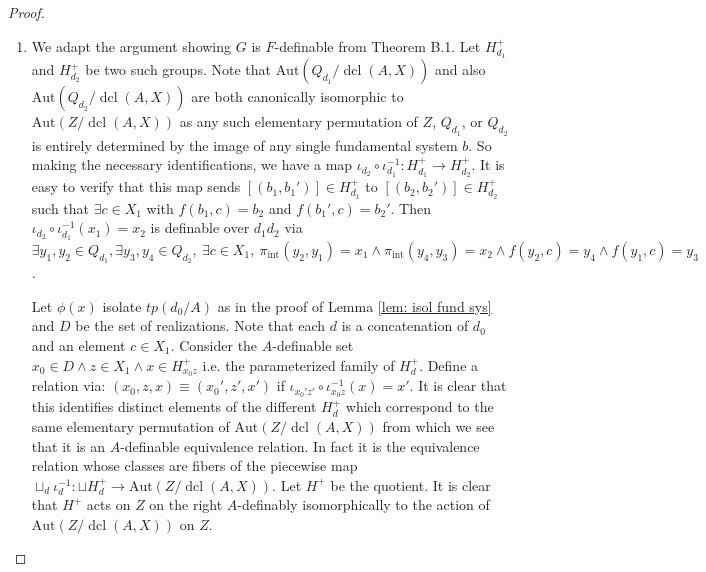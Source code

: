 \documentclass{amsart}
\theoremstyle{definition}
\theoremstyle{remark}
\numberwithin{equation}{section}
\def \tp {tp}
\def \aut {\text{Aut}}
\def \dcl {\operatorname{dcl}}
\begin{document}
\begin{proof}
\begin{enumerate}
        Let $\pi_{int}:Q^2_d \to H_d^+$ be the definable quotient map given by EI. The bijection $\iota_{d}:\aut(Q_{d}/\dcl(A,X)) \to H^+_{d}$ induces a group structure on $H^+_d$. It is an exercise to check that the group structure is defined by the following formula in the variables $x_1,x_2,x_3$ ranging over $H_d^+$:

        $\exists y_1,y_2,y_3 \in Q_d \ \pi_{int}(y_2,y_1) = x_2 \wedge \pi_{int}(y_3,y_2) = x_1 \wedge \pi_{int}(y_3,y_1) = x_3.$
        
        The action of $H^+_{d}$ on $Q_{d}$ is $A$-definable and agrees with the action of $\aut(Q_{\bar{d}}/\dcl(A,X))$: Let $[(b',b)] \in H^{+}_{\bar{d}}$ and $b'' \in Q_{d}$. Then we evaluate $[(b',b)]b''$ as the unique $b'''$ such that $\pi(b''',b'') = [(b',b)]$. This is $A$-definable. Let $x$ and $y,y_1$ be variables ranging over $H^{+}_{\bar{d}}$ and $Q_{d}$ respectively, then the action $xy = y_1$ is $A$-definable by the formula $\pi_{int}(y_1,y)=x$.   It is clear that this agrees with the action of $\aut(Q_{\bar{d}}/\dcl(A,X))$ on the left.
        
        \item We adapt the argument showing $G$ is $F$-definable from \cite{EhudHrushovski2002} Theorem B.1. Let $H^+_{d_1}$ and $H^+_{d_2}$ be two such groups. Note that $\aut(Q_{d_1}/\dcl(A,X))$ and also $\aut(Q_{d_2}/\dcl(A,X))$ are both canonically isomorphic to $\aut(Z/\dcl(A,X))$ as any such elementary permutation of $Z$, $Q_{d_1}$, or $Q_{d_2}$ is entirely determined by the image of any single fundamental system $b$. So making the necessary identifications, we have a map $\iota_{d_2}\circ \iota_{d_1}^{-1}:H^+_{d_1} \to H^+_{d_2}$. It is easy to verify that this map sends $[(b_1,b_1')] \in H^+_{d_1}$ to $[(b_2,b_2')] \in H^+_{d_2}$ such that $\exists c \in X_1$ with $f(b_1,c) = b_2$ and $f(b_1',c) = b_2'$. Then $\iota_{d_2}\circ \iota_{d_1}^{-1}(x_1) = x_2$ is definable over $d_1d_2$ via $\exists y_1,y_2 \in Q_{d_1}, \exists y_3,y_4 \in Q_{d_2}, \ \exists c \in X_1, \  \pi_{\text{int}}(y_2,y_1) = x_1 \wedge \pi_{\text{int}}(y_4,y_3) = x_2 \wedge f(y_2,c) = y_4 \wedge f(y_1,c) = y_3$.

        Let $\phi(x)$ isolate $\tp(d_0/A)$ as in the proof of Lemma \ref{lem: isol fund sys} and $D$ be the set of realizations. Note that each $d$ is a concatenation of $d_0$ and an element $c \in X_1$. Consider the $A$-definable set $x_0 \in D  \wedge  z \in X_1 \wedge x \in H_{x_0z}^+$ i.e. the parameterized family of $H^+_d$. Define a relation via: $(x_0,z,x) \equiv (x_0',z',x')$ if $\iota_{x_0'z'}\circ \iota_{x_0z}^{-1}(x) = x'$. It is clear that this identifies distinct elements of the different $H_d^+$ which correspond to the same elementary permutation of $\aut(Z/\dcl(A,X))$ from which we see that it is an $A$-definable equivalence relation. In fact it is the equivalence relation whose classes are fibers of the piecewise map $\sqcup_d\iota_d^{-1}:\sqcup H_{d}^{+} \to \aut(Z/\dcl(A,X))$. Let $H^+$ be the quotient. It is clear that $H^+$ acts on $Z$ on the right $A$-definably isomorphically to the action of $\aut(Z/\dcl(A,X))$ on $Z$.


\end{enumerate}
\end{proof}
\end{document}
